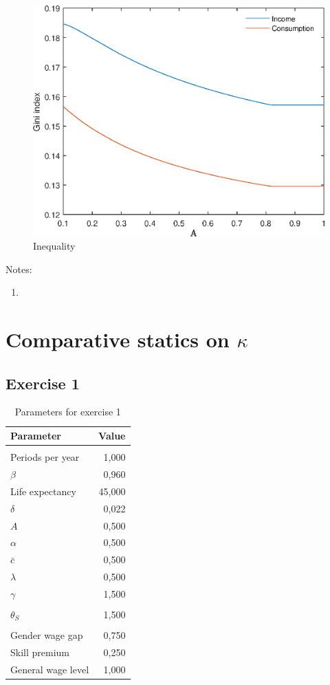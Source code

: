 \documentclass[12pt]{article}
\begin{document}
\begin{figure}
	\centering
	\caption{Inequality}
	\includegraphics{Graphs/ineq_A_ex1.eps}
\end{figure}

Notes:

\begin{enumerate}
	\item 
\end{enumerate}

\clearpage

\section{Comparative statics on $\kappa$}

\subsection{Exercise 1}

\begin{table}[htbp]
	\centering
	\caption{Parameters for exercise 1}
	\begin{tabular}{lr}
		\toprule
		Parameter & \multicolumn{1}{l}{Value} \\
		\midrule
		&  \\
		Periods per year & 1,000 \\
		$\beta$ & 0,960 \\
		Life expectancy & 45,000 \\
		$\delta$ & 0,022 \\
		$A$ & 0,500 \\
		$\alpha$ & 0,500 \\
		$\bar {c}$ & 0,500 \\
		$\lambda$ & 0,500 \\
		$\gamma$ & 1,500 \\
		&  \\
		$\theta_S$ & 1,500 \\
		&  \\
		Gender wage gap & 0,750 \\
		Skill premium & 0,250 \\
		General wage level & 1,000 \\
		\bottomrule
	\end{tabular}
\end{table}
\end{document}

